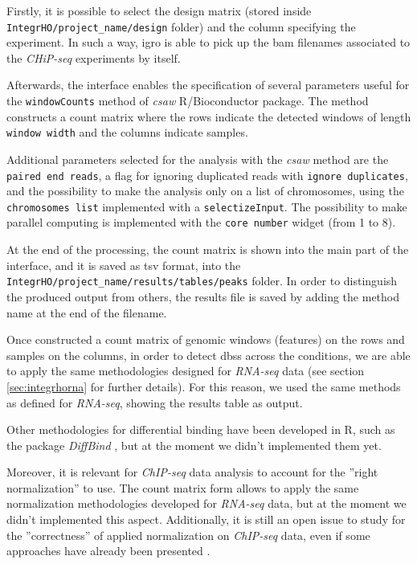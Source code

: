 Firstly, it is possible to select the design matrix (stored inside \lstinline!IntegrHO/project_name/design! folder) and the column specifying the experiment.
In such a way, \gls{igro} is able to pick up the \gls{bam} filenames associated to the \textit{CHiP-seq} experiments by itself.

Afterwards, the interface enables the specification of several parameters useful for the \lstinline!windowCounts! method of \textit{csaw} R/Bioconductor package.
The method constructs a count matrix where the rows indicate the detected windows of length \lstinline!window width! and the columns indicate samples.

Additional parameters selected for the analysis with the \textit{csaw} method are the \lstinline!paired end reads!, a flag for ignoring duplicated reads with \lstinline!ignore duplicates!, and the possibility to make the analysis only on a list of chromosomes, using the \lstinline!chromosomes list! implemented with a \lstinline!selectizeInput!.
The possibility to make parallel computing is implemented with the \lstinline!core number! widget (from 1 to 8).

At the end of the processing, the count matrix is shown into the main part of the interface, and it is saved as \gls{tsv} format, into the \lstinline!IntegrHO/project_name/results/tables/peaks! folder.
In order to distinguish the produced output from others, the results file is saved by adding the method name at the end of the filename.

Once constructed a count matrix of genomic windows (features) on the rows and samples on the columns, in order to detect \glspl{dbs} across the conditions, we are able to apply the same methodologies designed for \textit{RNA-seq} data (see section \ref{sec:integrhorna} for further details).
For this reason, we used the same methods as defined for \textit{RNA-seq}, showing the results table as output.

Other methodologies for differential binding have been developed in R, such as the package \textit{DiffBind} \cite{Ross-Innes2012}, but at the moment we didn't implemented them yet.

Moreover, it is relevant for \textit{ChIP-seq} data analysis to account for the ''right normalization'' to use.
The count matrix form allows to apply the same normalization methodologies developed for \textit{RNA-seq} data, but at the moment we didn't implemented this aspect.
Additionally, it is still an open issue to study for the ''correctness'' of applied normalization on \textit{ChIP-seq} data, even if some approaches have already been presented \cite{Angelini2015}.


